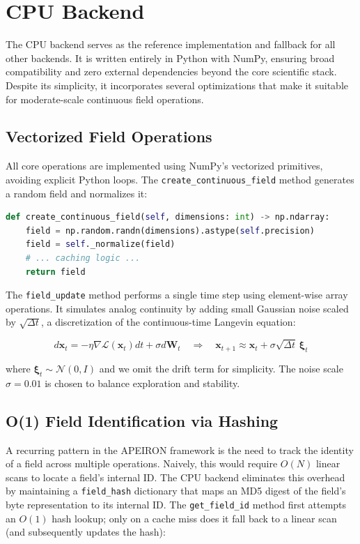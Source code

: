 \newpage
\section{CPU Backend}

The CPU backend serves as the reference implementation and fallback for all other backends. It is written entirely in Python with NumPy, ensuring broad compatibility and zero external dependencies beyond the core scientific stack. Despite its simplicity, it incorporates several optimizations that make it suitable for moderate-scale continuous field operations.

\subsection{Vectorized Field Operations}

All core operations are implemented using NumPy's vectorized primitives, avoiding explicit Python loops. The \texttt{create\_continuous\_field} method generates a random field and normalizes it:

\begin{lstlisting}[language=Python]
def create_continuous_field(self, dimensions: int) -> np.ndarray:
    field = np.random.randn(dimensions).astype(self.precision)
    field = self._normalize(field)
    # ... caching logic ...
    return field
\end{lstlisting}

The \texttt{field\_update} method performs a single time step using element-wise array operations. It simulates analog continuity by adding small Gaussian noise scaled by \(\sqrt{\Delta t}\), a discretization of the continuous-time Langevin equation:

\begin{equation}
d\mathbf{x}_t = -\eta \nabla \mathcal{L}(\mathbf{x}_t)dt + \sigma d\mathbf{W}_t \quad\Rightarrow\quad \mathbf{x}_{t+1} \approx \mathbf{x}_t + \sigma \sqrt{\Delta t}\,\boldsymbol{\xi}_t
\end{equation}

where \(\boldsymbol{\xi}_t \sim \mathcal{N}(0,I)\) and we omit the drift term for simplicity. The noise scale \(\sigma = 0.01\) is chosen to balance exploration and stability.

\subsection{O(1) Field Identification via Hashing}

A recurring pattern in the APEIRON framework is the need to track the identity of a field across multiple operations. Naively, this would require \(O(N)\) linear scans to locate a field's internal ID. The CPU backend eliminates this overhead by maintaining a \texttt{field\_hash} dictionary that maps an MD5 digest of the field's byte representation to its internal ID. The \texttt{get\_field\_id} method first attempts an \(O(1)\) hash lookup; only on a cache miss does it fall back to a linear scan (and subsequently updates the hash):

